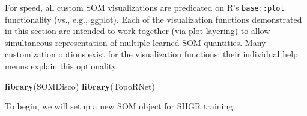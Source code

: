 \documentclass[]{article}
\newenvironment{Shaded}{\begin{snugshade}}{\end{snugshade}}
\newcommand{\KeywordTok}[1]{\textcolor[rgb]{0.13,0.29,0.53}{\textbf{#1}}}
\newcommand{\NormalTok}[1]{#1}
\begin{document}
For speed, all custom SOM visualizations are predicated on R's \texttt{base::plot} functionality (vs., e.g., ggplot). Each of the visualization functions demonstrated in this section are intended to work together (via plot layering) to allow simultaneous representation of multiple learned SOM quantities. Many customization options exist for the visualization functions; their individual help menus explain this optionality.

\begin{Shaded}
\begin{Highlighting}[]
\KeywordTok{library}\NormalTok{(SOMDisco)}
\KeywordTok{library}\NormalTok{(TopoRNet)}
\end{Highlighting}
\end{Shaded}

To begin, we will setup a new SOM object for SHGR training:
\end{document}
